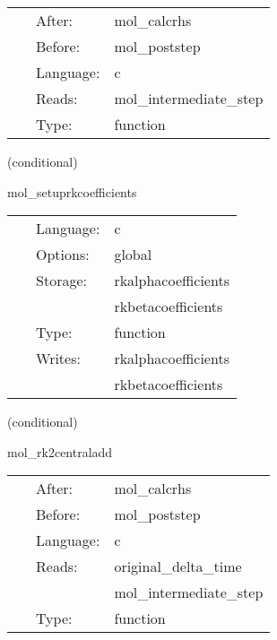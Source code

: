 \hspace{5mm}{\it updates calculated with the efficient runge-kutta 2 method } 


\hspace{5mm}

 \begin{tabular*}{160mm}{cll} 
~ & After:  & mol\_calcrhs \\ 
~ & Before:  & mol\_poststep \\ 
~ & Language:  & c \\ 
~ & Reads:  & mol\_intermediate\_step \\ 
~ & Type:  & function \\ 
\end{tabular*} 


\vspace{5mm}

   (conditional) 

\hspace{5mm} mol\_setuprkcoefficients 

\hspace{5mm}{\it initialize the generic runge-kutta coefficients } 


\hspace{5mm}

 \begin{tabular*}{160mm}{cll} 
~ & Language:  & c \\ 
~ & Options:  & global \\ 
~ & Storage:  & rkalphacoefficients \\ 
~& ~ &rkbetacoefficients\\ 
~ & Type:  & function \\ 
~ & Writes:  & rkalphacoefficients \\ 
~& ~ &rkbetacoefficients\\ 
\end{tabular*} 


\vspace{5mm}

   (conditional) 

\hspace{5mm} mol\_rk2centraladd 

\hspace{5mm}{\it updates calculated with the central runge-kutta 2 method } 


\hspace{5mm}

 \begin{tabular*}{160mm}{cll} 
~ & After:  & mol\_calcrhs \\ 
~ & Before:  & mol\_poststep \\ 
~ & Language:  & c \\ 
~ & Reads:  & original\_delta\_time \\ 
~& ~ &mol\_intermediate\_step\\ 
~ & Type:  & function \\ 
\end{tabular*} 


